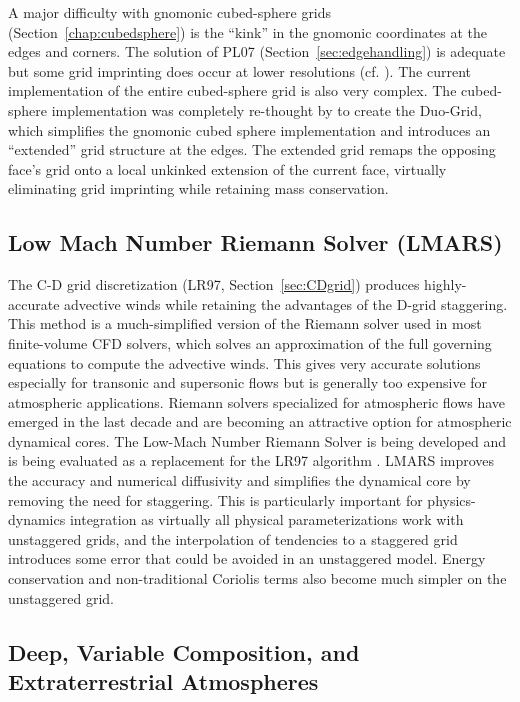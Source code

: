 \documentclass[10pt,letterpaper,margin=1in]{memoir}
\begin{document}
A major difficulty with gnomonic cubed-sphere grids (Section~\ref{chap:cubedsphere}) is the ``kink'' in the gnomonic coordinates at the edges and corners. The solution of PL07 (Section~\ref{sec:edgehandling}) is adequate but some grid imprinting does occur at lower resolutions (cf. \citet{Zhou2019}). The current implementation of the entire cubed-sphere grid is also very complex. The cubed-sphere implementation was completely re-thought by \citet{XChen2021} to create the Duo-Grid, which simplifies the gnomonic cubed sphere implementation and introduces an ``extended'' grid structure at the edges. The extended grid remaps the opposing face's grid onto a local unkinked extension of the current face, virtually eliminating grid imprinting while retaining mass conservation. 

\subsection{Low Mach Number Riemann Solver (LMARS)}

The C-D grid discretization (LR97, Section~\ref{sec:CDgrid}) produces highly-accurate advective winds while retaining the advantages of the D-grid staggering. This method is a much-simplified version of the Riemann solver used in most finite-volume CFD solvers, which solves an approximation of the full governing equations to compute the advective winds. This gives very accurate solutions especially for transonic and supersonic flows but is generally too expensive for atmospheric applications. Riemann solvers specialized for atmospheric flows have emerged in the last decade and are becoming an attractive option for atmospheric dynamical cores. The Low-Mach Number Riemann Solver \citep[LMARS;][]{XChen2013} is being developed and is being evaluated as a replacement for the LR97 algorithm \citep{XChen2021}. LMARS improves the accuracy and numerical diffusivity and simplifies the dynamical core by removing the need for staggering. This is particularly important for physics-dynamics integration as virtually all physical parameterizations work with unstaggered grids, and the interpolation of tendencies to a staggered grid introduces some error that could be avoided in an unstaggered model. Energy conservation and non-traditional Coriolis terms also become much simpler on the unstaggered grid.


\subsection{Deep, Variable Composition, and Extraterrestrial Atmospheres}
\end{document}
